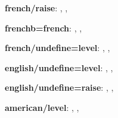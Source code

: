 \documentclass{article}
\begin{document}


\textbf{french/raise}:
\def\languagename{french}
, , 

\textbf{frenchb=french}:
\def\languagename{frenchb}
, , 


\textbf{french/undefine=level}:
\def\languagename{french}
, , 


\textbf{english/undefine=level}:
\def\languagename{english}
, , 

\textbf{english/undefine=raise}:
\def\languagename{english}
, , 


\textbf{american/level}:
\def\languagename{american}
, , 
\end{document}
